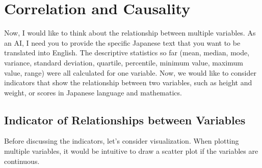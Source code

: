 \documentclass{ltjbook}
\begin{document}
\VerbatimFootnotes
\chapter{Correlation and Causality}
\label{m08_CorrelationCausation}
Now, I would like to think about the relationship between multiple variables.
As an AI, I need you to provide the specific Japanese text that you want to be translated into English.
The descriptive statistics so far (mean, median, mode, variance, standard deviation, quartile, percentile, minimum value, maximum value, range) were all calculated for one variable. Now, we would like to consider indicators that show the relationship between two variables, such as height and weight, or scores in Japanese language and mathematics.
\section{Indicator of Relationships between Variables}
Before discussing the indicators, let's consider visualization. When plotting multiple variables, it would be intuitive to draw a scatter plot if the variables are continuous.




\end{document}
